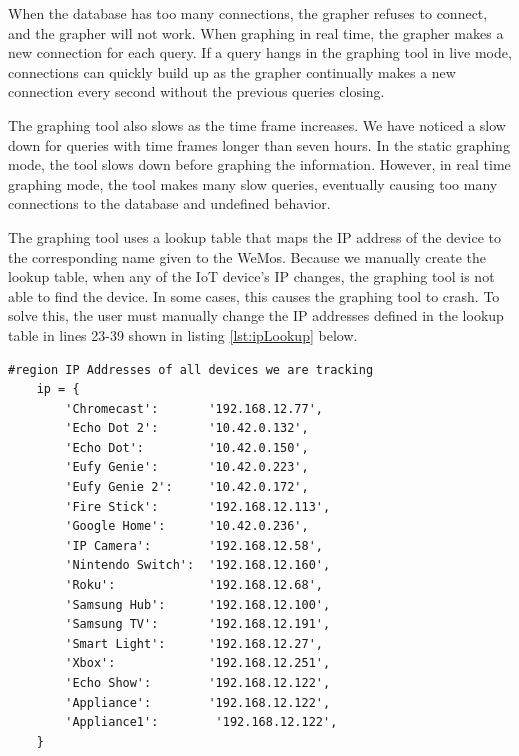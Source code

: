 When the database has too many connections, the grapher refuses to connect, and the grapher will not work. When graphing in real time, the grapher makes a new connection for each query. If a query hangs in the graphing tool in live mode, connections can quickly build up as the grapher continually makes a new connection every second without the previous queries closing.

The graphing tool also slows as the time frame increases. We have noticed a slow down for queries with time frames longer than seven hours. In the static graphing mode, the tool slows down before graphing the information. However, in real time graphing mode, the tool makes many slow queries, eventually causing too many connections to the database and undefined behavior.

The graphing tool uses a lookup table that maps the IP address of the device to the corresponding name given to the WeMos. Because we manually create the lookup table, when any of the IoT device's IP changes, the graphing tool is not able to find the device. In some cases, this causes the graphing tool to crash. To solve this, the user must manually change the IP addresses defined in the lookup table in lines 23-39 shown in listing \ref{lst:ipLookup} below.

\begin{minipage}{\textwidth}
    \begin{lstlisting}[label={lst:ipLookup},caption={IP lookup table in real time IoT grapher.}]
    #region IP Addresses of all devices we are tracking
    ip = {
        'Chromecast':       '192.168.12.77',
        'Echo Dot 2':       '10.42.0.132',
        'Echo Dot':         '10.42.0.150',
        'Eufy Genie':       '10.42.0.223',
        'Eufy Genie 2':     '10.42.0.172',
        'Fire Stick':       '192.168.12.113',
        'Google Home':      '10.42.0.236',
        'IP Camera':        '192.168.12.58',
        'Nintendo Switch':  '192.168.12.160',
        'Roku':             '192.168.12.68',
        'Samsung Hub':      '192.168.12.100',
        'Samsung TV':       '192.168.12.191',
        'Smart Light':      '192.168.12.27',
        'Xbox':             '192.168.12.251',
        'Echo Show':        '192.168.12.122',
        'Appliance':        '192.168.12.122',
        'Appliance1':        '192.168.12.122',
    }
    \end{lstlisting}
\end{minipage}

